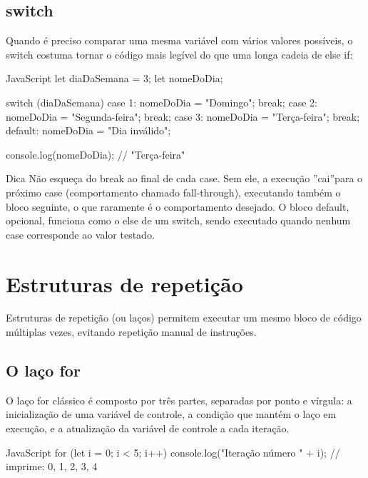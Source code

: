 \subsection{switch}

Quando é preciso comparar uma mesma variável com vários valores possíveis, o switch costuma tornar o código mais legível do que uma longa cadeia de else if:

\begin{codebox}{JavaScript}
let diaDaSemana = 3;
let nomeDoDia;

switch (diaDaSemana) {
  case 1:
    nomeDoDia = "Domingo";
    break;
  case 2:
    nomeDoDia = "Segunda-feira";
    break;
  case 3:
    nomeDoDia = "Terça-feira";
    break;
  default:
    nomeDoDia = "Dia inválido";
}



console.log(nomeDoDia); // "Terça-feira"
\end{codebox}

\begin{infobox}{Dica}
Não esqueça do break ao final de cada case. Sem ele, a execução ”cai”para o próximo case (comportamento chamado fall-through), executando também o bloco seguinte, o que raramente é o comportamento desejado. O bloco default, opcional, funciona como o else de um switch, sendo executado quando nenhum case corresponde ao valor testado.
\end{infobox}

\section{Estruturas de repetição}

Estruturas de repetição (ou laços) permitem executar um mesmo bloco de código múltiplas vezes, evitando repetição manual de instruções.

\subsection{O laço for}

O laço for clássico é composto por três partes, separadas por ponto e vírgula: a inicialização de uma variável de controle, a condição que mantém o laço em execução, e a atualização da variável de controle a cada iteração.

\begin{codebox}{JavaScript}
for (let i = 0; i < 5; i++) {
  console.log("Iteração número " + i);
}
// imprime: 0, 1, 2, 3, 4
\end{codebox}

